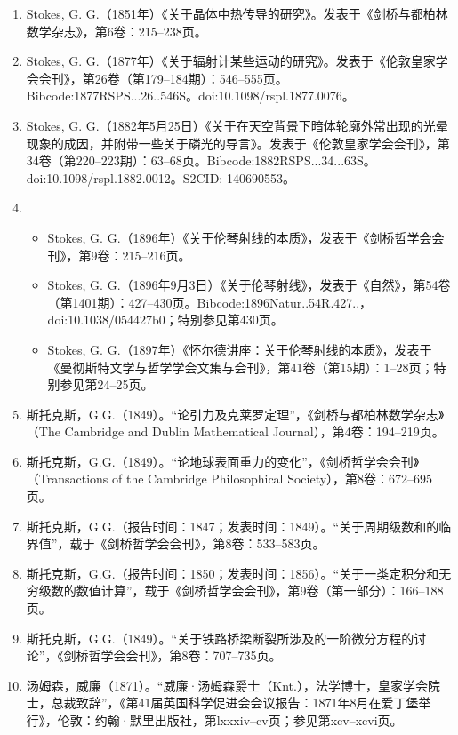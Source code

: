\begin{enumerate}
\item Stokes, G. G.（1851年）《关于晶体中热传导的研究》。发表于《剑桥与都柏林数学杂志》，第6卷：215–238页。
\item Stokes, G. G.（1877年）《关于辐射计某些运动的研究》。发表于《伦敦皇家学会会刊》，第26卷（第179–184期）：546–555页。Bibcode:1877RSPS...26..546S。doi:10.1098/rspl.1877.0076。
\item Stokes, G. G.（1882年5月25日）《关于在天空背景下暗体轮廓外常出现的光晕现象的成因，并附带一些关于磷光的导言》。发表于《伦敦皇家学会会刊》，第34卷（第220–223期）：63–68页。Bibcode:1882RSPS...34...63S。doi:10.1098/rspl.1882.0012。S2CID: 140690553。
\item 
\begin{itemize}
\item Stokes, G. G.（1896年）《关于伦琴射线的本质》，发表于《剑桥哲学会会刊》，第9卷：215–216页。
\item Stokes, G. G.（1896年9月3日）《关于伦琴射线》，发表于《自然》，第54卷（第1401期）：427–430页。Bibcode:1896Natur..54R.427..，doi:10.1038/054427b0；特别参见第430页。
\item Stokes, G. G.（1897年）《怀尔德讲座：关于伦琴射线的本质》，发表于《曼彻斯特文学与哲学学会文集与会刊》，第41卷（第15期）：1–28页；特别参见第24–25页。
\end{itemize}
\item 斯托克斯，G.G.（1849）。“论引力及克莱罗定理”，《剑桥与都柏林数学杂志》（The Cambridge and Dublin Mathematical Journal），第4卷：194–219页。

\item 斯托克斯，G.G.（1849）。“论地球表面重力的变化”，《剑桥哲学会会刊》（Transactions of the Cambridge Philosophical Society），第8卷：672–695页。

\item 斯托克斯，G.G.（报告时间：1847；发表时间：1849）。“关于周期级数和的临界值”，载于《剑桥哲学会会刊》，第8卷：533–583页。

\item 斯托克斯，G.G.（报告时间：1850；发表时间：1856）。“关于一类定积分和无穷级数的数值计算”，载于《剑桥哲学会会刊》，第9卷（第一部分）：166–188页。

\item 斯托克斯，G.G.（1849）。“关于铁路桥梁断裂所涉及的一阶微分方程的讨论”，《剑桥哲学会会刊》，第8卷：707–735页。

\item 汤姆森，威廉（1871）。“威廉·汤姆森爵士（Knt.），法学博士，皇家学会院士，总裁致辞”，《第41届英国科学促进会会议报告：1871年8月在爱丁堡举行》，伦敦：约翰·默里出版社，第lxxxiv–cv页；参见第xcv–xcvi页。


\end{enumerate}
